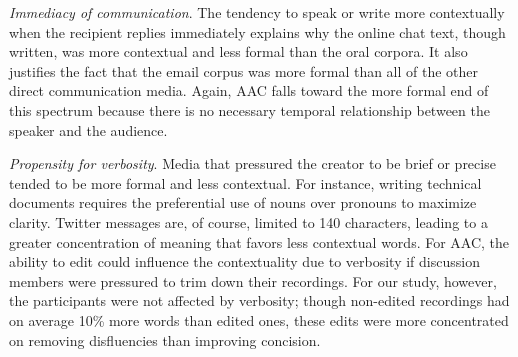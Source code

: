 \emph{Immediacy of communication}. 
The tendency to speak or write more contextually when the recipient replies immediately explains why the online chat text, though written, was more contextual and less formal than the oral corpora. 
It also justifies the fact that the email corpus was more formal than all of the other direct communication media.
Again, AAC falls toward the more formal end of this spectrum because there is no necessary temporal relationship between the speaker and the audience.

\emph{Propensity for verbosity}.
Media that pressured the creator to be brief or precise tended to be more formal and less contextual.
For instance, writing technical documents requires the preferential use of nouns over pronouns to maximize clarity.
Twitter messages are, of course, limited to 140 characters, leading to a greater concentration of meaning that favors less contextual words.
For AAC, the ability to edit could influence the contextuality due to verbosity if discussion members were pressured to trim down their recordings. 
For our study, however, the participants were not affected by verbosity; though non-edited recordings had on average 10\% more words than edited ones, these edits were more concentrated on removing disfluencies than improving concision.